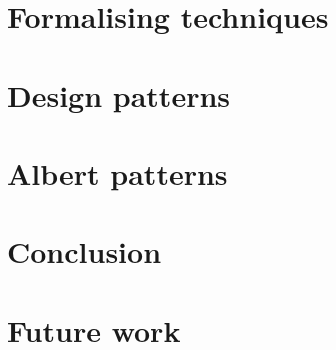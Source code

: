 \documentclass{tufte-handout}
\begin{document}
\section{Formalising techniques}

\section{Design patterns}

\section{Albert patterns}

\section{Conclusion}

\section{Future work}
\end{document}
